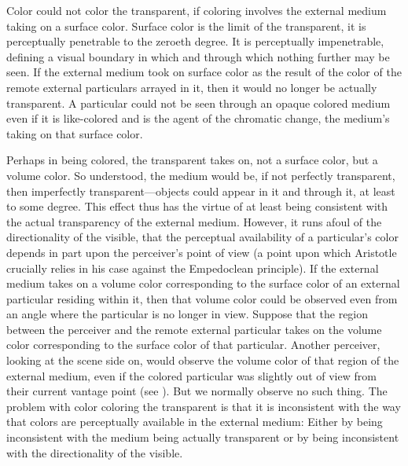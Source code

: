 Color could not color the transparent, if coloring involves the external me\-di\-um taking on a surface color. Surface color is the limit of the transparent, it is perceptually penetrable to the zeroeth degree. It is perceptually impenetrable, defining a visual boundary in which and  through which nothing further may be seen. If the external medium took on surface color as the result of the color of the remote external particulars arrayed in it, then it would no longer be actually transparent. A particular could not be seen through an opaque colored medium even if it is like-colored and is the agent of the chromatic change, the medium's taking on that surface color.

Perhaps in being colored, the transparent takes on, not a surface color, but a volume color. So understood, the medium would be, if not perfectly transparent, then imperfectly transparent---objects could appear in it and through it, at least to some degree. This effect thus has the virtue of at least being consistent with the actual transparency of the external medium. However, it runs afoul of the directionality of the visible, that the perceptual availability of a particular's color depends in part upon the perceiver's point of view (a point upon which Aristotle crucially relies in his case against the Empedoclean principle). If the external medium takes on a volume color corresponding to the surface color of an external particular residing within it, then that volume color could be observed even from an angle where the particular is no longer in view. Suppose that the region between the perceiver and the remote external particular takes on the volume color corresponding to the surface color of that particular. Another perceiver, looking at the scene side on, would observe the volume color of that region of the external medium, even if the colored particular was slightly out of view from their current vantage point (see \citealt[425]{Burnyeat:1995fk}). But we normally observe no such thing. The problem with color coloring the transparent is that it is inconsistent with the way that colors are perceptually available in the external medium: Either by being inconsistent with the medium being actually transparent or by being inconsistent with the directionality of the visible.

